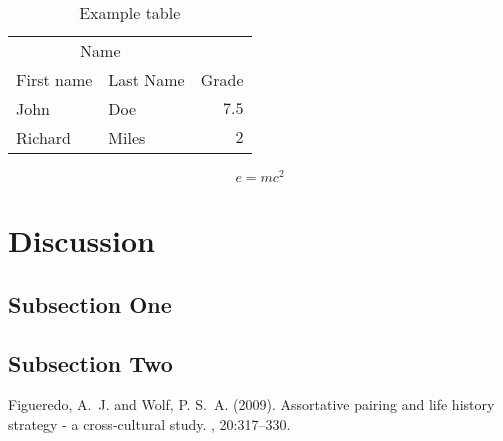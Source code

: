 \documentclass[twoside,twocolumn]{article}
\begin{document}
    \begin{table}
        \caption{Example table}
        \centering

        \begin{tabular}{llr}
            \toprule
            \multicolumn{2}{c}{Name} \\
            \cmidrule(r){1-2}
                First name & Last Name & Grade \\
            \midrule
                John & Doe & $7.5$ \\
                Richard & Miles & $2$ \\
            \bottomrule

        \end{tabular}
    \end{table}

    \blindtext %

    \begin{equation}
        \label{eq:emc}
        e = mc^2
    \end{equation}

    \blindtext %


\section{Discussion}

    \subsection{Subsection One}

        \blindtext %

    \subsection{Subsection Two}

        \blindtext %


\begin{thebibliography}{99} %

        Figueredo, A.~J. and Wolf, P. S.~A. (2009).
    \newblock Assortative pairing and life history strategy - a cross-cultural
       study.
    , 20:317--330.
 
\end{thebibliography}

\end{document}
